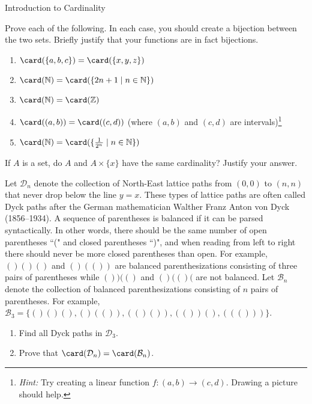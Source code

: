 \begin{section}{Introduction to Cardinality}
\begin{problem}\label{prob:cardinalityPractice}
Prove each of the following. In each case, you should create a bijection between the two sets. Briefly justify that your functions are in fact bijections.
\begin{enumerate}[label=\textrm{(\alph*)}]
\item $\card(\{a,b,c\})=\card(\{x,y,z\})$
\item $\card(\mathbb{N})=\card(\{2n+1\mid n\in \mathbb{N}\})$
\item $\card(\mathbb{N})=\card(\mathbb{Z})$
\item $\card((a,b))=\card((c,d))$ (where $(a,b)$ and $(c,d)$ are intervals)\footnote{\emph{Hint:} Try creating a linear function $f:(a,b)\to (c,d)$. Drawing a picture should help.}
\item $\card(\mathbb{N})=\card(\{\frac{1}{2^n}\mid n\in \mathbb{N}\})$
\end{enumerate}
\end{problem}

\begin{problem}
If $A$ is a set, do $A$ and $A\times \{x\}$ have the same cardinality?  Justify your answer.
\end{problem}

\begin{problem}
Let $\mathcal{D}_n$ denote the collection of North-East lattice paths from $(0,0)$ to $(n,n)$ that never drop below the line $y=x$.  These types of lattice paths are often called Dyck paths after the German mathematician Walther Franz Anton von Dyck (1856--1934). A sequence of parentheses is balanced if it can be parsed syntactically. In other words, there should be the same number of open parentheses ``(" and closed parentheses ``)", and when reading from left to right there should never be more closed parentheses than open. For example, $()()()$ and $()(())$ are balanced parenthesizations consisting of three pairs of parentheses while $())(()$ and $()(()($ are not balanced. Let $\mathcal{B}_n$ denote the collection of balanced parenthesizations consisting of $n$ pairs of parentheses.  For example, $\mathcal{B}_3=\{()()(), ()(()), (()()), (())(), ((()))\}$.
\begin{enumerate}[label=\textrm{(\alph*)}]
\item Find all Dyck paths in $\mathcal{D}_3$.
\item Prove that $\card(\mathcal{D}_n)=\card(\mathcal{B}_n)$.
\end{enumerate}
\end{problem}


\end{section}
